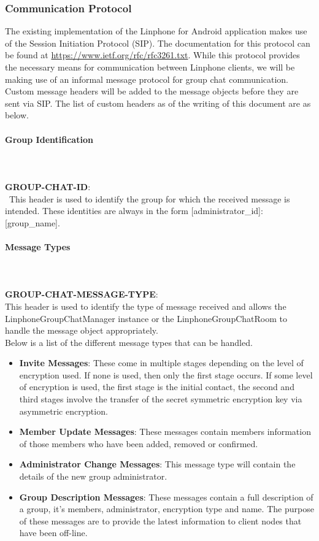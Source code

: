 \documentclass[11pt]{article}
\begin{document}
\subsubsection{Communication Protocol}
The existing implementation of the Linphone for Android application makes use of the Session Initiation Protocol (SIP). The documentation for this protocol can be found at \href{https://www.ietf.org/rfc/rfc3261.txt}{https://www.ietf.org/rfc/rfc3261.txt}. While this protocol provides the necessary means for communication between Linphone clients, we will be making use of an informal message protocol for group chat communication. Custom message headers will be added to the message objects before they are sent via SIP. The list of custom headers as of the writing of this document are as below.

\paragraph{Group Identification}\mbox{}\\ \\
\textbf{\small GROUP-CHAT-ID}:\\\
 This header is used to identify the group for which the received message is intended.  These identities are always in the form [administrator\_id]:[group\_name].

\paragraph{Message Types}\mbox{}\\ \\
\textbf{\small GROUP-CHAT-MESSAGE-TYPE}:\\
 This header is used to identify the type of message received and allows the LinphoneGroupChatManager instance or the LinphoneGroupChatRoom to handle the message object appropriately.\\
 
Below is a list of the different message types that can be handled.
\begin{itemize}
\item \textbf{Invite Messages}: These come in multiple stages depending on the level of encryption used. If none is used, then only the first stage occurs. If some level of encryption is used, the first stage is the initial contact, the second and third stages involve the transfer of the secret symmetric encryption key via asymmetric encryption.
\item \textbf{Member Update Messages}: These messages contain members information of those members who have been added, removed or confirmed.
\item \textbf{Administrator Change Messages}: This message type will contain the details of the new group administrator.
\item \textbf{Group Description Messages}: These messages contain a full description of a group, it's members, administrator, encryption type and name. The purpose of these messages are to provide the latest information to client nodes that have been off-line.
\end{itemize}
\end{document}
